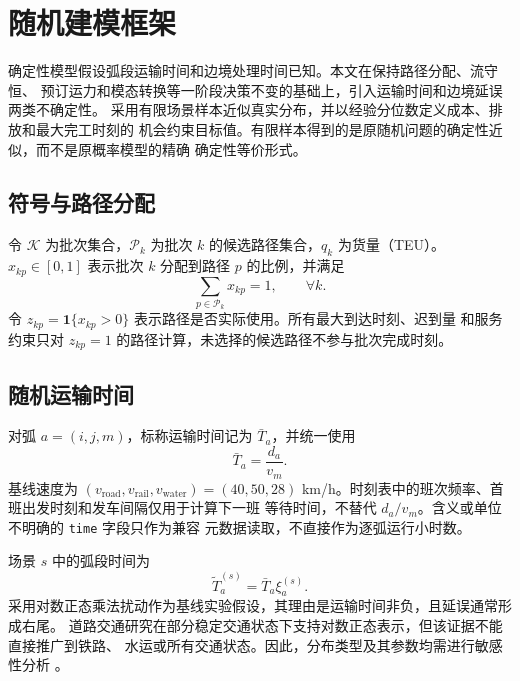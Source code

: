 
\section{随机建模框架}\label{sec:stochastic}

确定性模型假设弧段运输时间和边境处理时间已知。本文在保持路径分配、流守恒、
预订运力和模态转换等一阶段决策不变的基础上，引入运输时间和边境延误两类不确定性。
采用有限场景样本近似真实分布，并以经验分位数定义成本、排放和最大完工时刻的
机会约束目标值。有限样本得到的是原随机问题的确定性近似，而不是原概率模型的精确
确定性等价形式。

\subsection{符号与路径分配}

令 $\mathcal K$ 为批次集合，$\mathcal P_k$ 为批次 $k$ 的候选路径集合，$q_k$
为货量（TEU）。$x_{kp}\in[0,1]$ 表示批次 $k$ 分配到路径 $p$ 的比例，并满足
\begin{equation}
  \sum_{p\in\mathcal P_k}x_{kp}=1,\qquad \forall k.
\end{equation}
令 $z_{kp}=\mathbf 1\{x_{kp}>0\}$ 表示路径是否实际使用。所有最大到达时刻、迟到量
和服务约束只对 $z_{kp}=1$ 的路径计算，未选择的候选路径不参与批次完成时刻。

\subsection{随机运输时间}

对弧 $a=(i,j,m)$，标称运输时间记为 $\bar T_a$，并统一使用
\begin{equation}
  \bar T_a=\frac{d_a}{v_m}.
\end{equation}
基线速度为 $(v_{\mathrm{road}},v_{\mathrm{rail}},v_{\mathrm{water}})
=(40,50,28)$ km/h。时刻表中的班次频率、首班出发时刻和发车间隔仅用于计算下一班
等待时间，不替代 $d_a/v_m$。含义或单位不明确的 \texttt{time} 字段只作为兼容
元数据读取，不直接作为逐弧运行小时数。

场景 $s$ 中的弧段时间为
\begin{equation}\label{eq:travel_random_cn}
  \tilde T_a^{(s)}=\bar T_a\xi_a^{(s)}.
\end{equation}
采用对数正态乘法扰动作为基线实验假设，其理由是运输时间非负，且延误通常形成右尾。
道路交通研究在部分稳定交通状态下支持对数正态表示，但该证据不能直接推广到铁路、
水运或所有交通状态。因此，分布类型及其参数均需进行敏感性分析
\citep{Chalumuri2014,Rakha2010,Zhao2018,Hrusovsky2018}。

